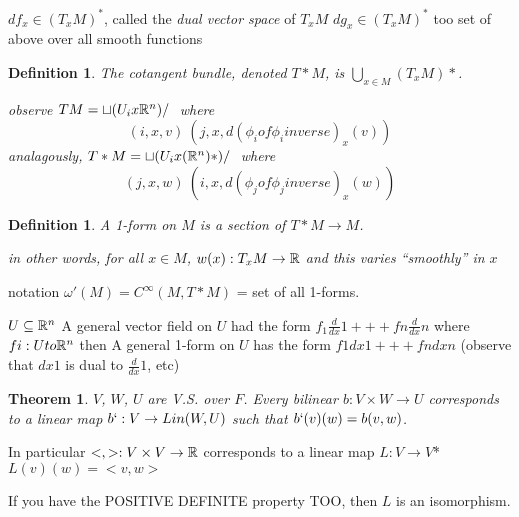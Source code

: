 \documentclass[11pt]{amsbook}
\newenvironment{dateenv}{
	\vspace{1em}
}{
	\vspace{1em}
}
\newcommand{\mydate}[4]{
	\newdate{#1}{#2}{#3}{#4}
	\begin{dateenv}
		\hfill\displaydate{#1}
	\end{dateenv}
}
\theoremstyle{mystyle} \newtheorem{thrm}[thm]{Theorem}
\theoremstyle{mystyle} \newtheorem{defi}[thm]{Definition}
\theoremstyle{mystyle} \newtheorem{coro}[thm]{Corollary}
\theoremstyle{mystyle} \newtheorem{propo}[thm]{Proposition}
\theoremstyle{mystyle} \newtheorem{lemm}[thm]{Lemma}
\numberwithin{thm}{section}
\newcommand{\x}{\times}
\newcommand{\de}{\emph}
\begin{document}
$df_x \in (T_xM)^*$, called the \de{dual vector space} of $T_xM$
$dg_x \in (T_xM)^*$ too
set of above over all smooth functions

\begin{defi}
	The \de{cotangent bundle}, denoted $T*M$, is
	$\bigcup_{x \in M} (T_xM)*$.


	observe
	$TM = \sqcup (U_i x {\mathbb R}^n)/~$
	where $$(i, x, v) ~ (j, x, d(\phi_i of \phi_i inverse)_x(v))$$
	analagously,
	$T*M = \sqcup (U_i x ({\mathbb R}^n)*)/~$
	where $$(j, x, w) ~ (i, x, d(\phi_j of \phi_j inverse)_x(w))$$
\end{defi}
\begin{defi}
	A \de{1-form} on $M$ is a section of $T*M \to M$.

	in other words, for all $x \in M$, $w(x): T_xM \to {\mathbb R}$ and this varies ``smoothly'' in $x$
\end{defi}
	notation
	$\omega'(M) = C^\infty(M, T*M)$ = set of all 1-forms.

\begin{example}
	$U \subseteq {\mathbb R}^n$
	A general vector field on $U$ had the form
	$f_1 \frac{d}{dx}1 +++ fn \frac{d}{dx}n$
	where $fi : U to {\mathbb R}^n$
	then
	A general 1-form on $U$ has the form
	$f1 dx1 +++ fn dxn$
	(observe that $dx1$ is dual to $\frac{d}{dx}1$, etc)
\end{example}

\mydate{d7}{17}{10}{2016}

\begin{thrm}
	$V$, $W$, $U$ are V.S. over $F$.  Every bilinear $b:V \x W \to U$ corresponds to a linear map $b` : V \to Lin(W,U)$
	such that $b`(v)(w) = b(v,w)$.
\end{thrm}
	In particular $<,> : V \x V \to \R$
	corresponds to a linear map
	$L: V \to V$*
	$L(v)(w) = <v,w>$

	If you have the POSITIVE DEFINITE property TOO, then $L$ is an isomorphism.
\end{document}
